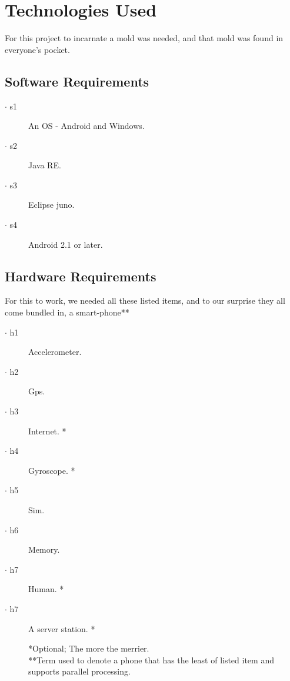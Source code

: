 \section{Technologies Used}
\label{sec:sec04}

For this project to incarnate a mold was needed, and that mold was found in everyone's pocket. \\

\subsection{Software Requirements}
\label{subsec:subsec01}

\begin{description}
\item[$\cdot$ s1] An OS - Android and Windows.
\item[$\cdot$ s2] Java RE.
\item[$\cdot$ s3] Eclipse juno.
\item[$\cdot$ s4] Android 2.1 or later.

\end{description}

\subsection{Hardware  Requirements}
\label{subsec:subsec02}
For this to work, we needed all these listed items, and to our surprise they all come bundled in, a smart-phone**
\begin{description}


\item[$\cdot$ h1] Accelerometer.
\item[$\cdot$ h2] Gps.
\item[$\cdot$ h3] Internet. *
\item[$\cdot$ h4] Gyroscope. *
\item[$\cdot$ h5] Sim.
\item[$\cdot$ h6] Memory.
\item[$\cdot$ h7] Human. *
\item[$\cdot$ h7] A server station. *



*Optional; The more the merrier. \\
**Term used to denote a phone that has the least of listed item and supports parallel processing.
\end{description}



